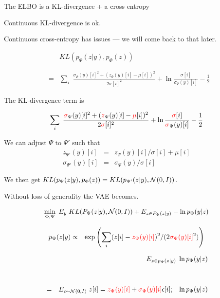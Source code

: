 {\vfill
The ELBO is a KL-divergence + a cross entropy

\vfill
Continuous KL-divergence is ok.

\vfill
Continuous cross-entropy has issues --- we will come back to that
later.


\begin{eqnarray*}
& & KL(p_\Psi(z|y),p_\Phi(z)) \\
\\
\\
& = & \sum_i \;\frac{\sigma_\Psi(y)[i]^2 + (z_\Psi(y)[i]-\mu[i])^2}{2 \sigma[i]^2}
+ \ln\frac{\sigma[i]}{\sigma_\Psi(y)[i]} - \frac{1}{2}
\end{eqnarray*}



The KL-divergence term is
    
$$\sum_i \;\frac{{\color{red} \sigma}_\Psi(y)[i]^2 +({\color{red} z}_\Psi(y)[i] - {\color{red} \mu}[i])^2}{2 {\color{red} \sigma}[i]^2} + \ln\frac{{\color{red} \sigma}[i]}{{\color{red} \sigma}_\Psi(y)[i]} - \frac{1}{2}$$

\vfill
We can adjust $\Psi$ to $\Psi'$ such that
\begin{eqnarray*}
z_{\Psi'}(y)[i] & = & z_\Psi(y)[i]/\sigma[i] + \mu[i] \\
\sigma_{\Psi'}(y)[i] & = & \sigma_\Psi(y)/\sigma[i]
\end{eqnarray*}

\vfill
We then get {\color{red} $KL(p_{\Psi}(z|y),p_\Phi(z)) = KL(p_{\Psi'}(z|y),{\cal N}(0,I))$}.


\vfill
Without loss of generality the VAE becomes.

{\color{red} $$\min_{\Phi,\Psi}\; E_y\;KL(P_\Psi(z|y),{\cal N}(0,I)) + E_{z \in P_\Psi(z|y)} - \ln p_\Phi(y|z) $$}

\begin{eqnarray*}
p_\Psi(z|y) & \propto & \exp\left(\sum_i (z[i] - {\color{red}
z_\Psi(y)[i]})^2/(2{\color{red} \sigma_\Psi(y)[i]}^2)\right)
\end{eqnarray*}

\vfill
\begin{eqnarray*}
& & E_{z \in p_\Psi(z|y)} \;\ln p_\Phi(y|z)\\
\\
\\
& = & E_{\epsilon \sim {\cal N}(0,I)} \;z[i] = {\color{red}
z_\Psi(y)[i]} + {\color{red} \sigma_\Psi(y)[i]}\epsilon[i];\;\; \;\ln
p_\Phi(y|z)
\end{eqnarray*}

}
